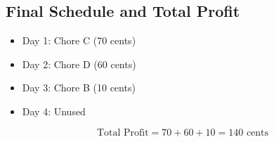 \documentclass[12pt]{article}
\begin{document}
\subsection*{Final Schedule and Total Profit}

\begin{itemize}
    \item Day 1: Chore C (70 cents)
    \item Day 2: Chore D (60 cents)
    \item Day 3: Chore B (10 cents)
    \item Day 4: Unused
\end{itemize}

\[
\text{Total Profit} = 70 + 60 + 10 = \boxed{140 \text{ cents}}
\]
\end{document}
